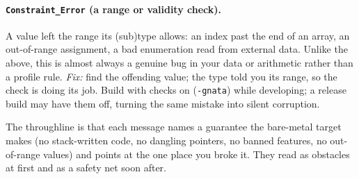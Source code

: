 \paragraph{\texttt{Constraint\_Error} (a range or validity check).}
A value left the range its (sub)type allows: an index past the end of an array,
an out-of-range assignment, a bad enumeration read from external data. Unlike the
above, this is almost always a genuine bug in your data or arithmetic rather than a
profile rule. \emph{Fix:} find the offending value; the type told you its range, so
the check is doing its job. Build with checks on (\texttt{-gnata}) while developing;
a release build may have them off, turning the same mistake into silent
corruption.

The throughline is that each message names a guarantee the bare-metal target makes
(no stack-written code, no dangling pointers, no banned features, no out-of-range
values) and points at the one place you broke it. They read as obstacles at first
and as a safety net soon after.
